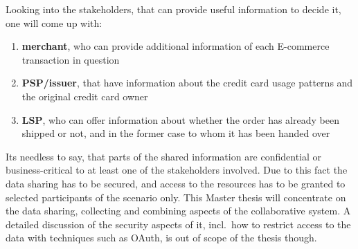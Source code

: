 Looking into the stakeholders, that can provide useful information to decide it, one will come up with:\@

\begin{enumerate}
    \item \textbf{merchant}, who can provide additional information of each \gls{E-commerce} transaction in question
    \item \textbf{\gls{PSP}/issuer}, that have information about the credit card usage patterns and the original credit card owner
    \item \textbf{\gls{LSP}}, who can offer information about whether the order has already been shipped or not, and in the former case to whom it has been handed over
\end{enumerate}

Its needless to say, that parts of the shared information are confidential or business-critical to at least one of the stakeholders involved. Due to this fact the data sharing has to be secured, and access to the resources has to be granted to selected participants of the scenario only. This Master thesis will concentrate on the data sharing, collecting and combining aspects of the collaborative system. A detailed discussion of the security aspects of it, incl.\ how to restrict access to the data with techniques such as OAuth, is out of scope of the thesis though.

